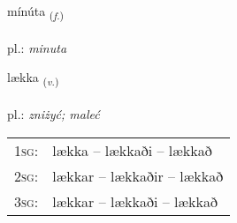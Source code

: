 \documentclass[frontgrid, backgrid]{flacards}\usepackage[]{graphicx}\usepackage[]{xcolor}
\begin{document}
\renewcommand{\flhead}{\vskip5pt \fboxsep=0pt {\small\bfseries\footnotesize Nafnorð | rzeczownik}}
\renewcommand{\fcfoot}{\vskip5pt \fboxsep=0pt \hspace{2pt}{\small\bfseries\footnotesize 1K}}

\renewcommand{\blhead}{\vskip5pt {\small\bfseries\footnotesize Nafnorð | rzeczownik }}
\renewcommand{\bcfoot}{\vskip5pt \hspace{2pt}{\small\bfseries\footnotesize 1K}}


{mínúta \small{\textsubscript{(\textit{f.})}} \\[1ex] %
\textphonetic{[miːnuta]} \\
pl.: \emph{minuta} \\  [2ex]
\renewcommand*{\arraystretch}{0.8}
}

\renewcommand{\flhead}{\vskip5pt \fboxsep=0pt {\small\bfseries\footnotesize Sagnorð | czasownik}}
\renewcommand{\fcfoot}{\vskip5pt \fboxsep=0pt \hspace{2pt}{\small\bfseries\footnotesize 1K}}

\renewcommand{\blhead}{\vskip5pt {\small\bfseries\footnotesize Sagnorð | czasownik }}
\renewcommand{\bcfoot}{\vskip5pt \hspace{2pt}{\small\bfseries\footnotesize 1K}}


{lækka \small{\textsubscript{(\textit{v.})}} \\[1ex] %
\textphonetic{[laihka]} \\
pl.: \emph{zniżyć; maleć} \\  [2ex]
\renewcommand*{\arraystretch}{0.8}
\begin{tabular}{p{1cm}l}
\textsc{1sg}: & lækka -- lækkaði -- lækkað \\ 
\textsc{2sg}: & lækkar -- lækkaðir -- lækkað \\ 
\textsc{3sg}: & lækkar -- lækkaði -- lækkað \\ 
\end{tabular}
}
\end{document}
